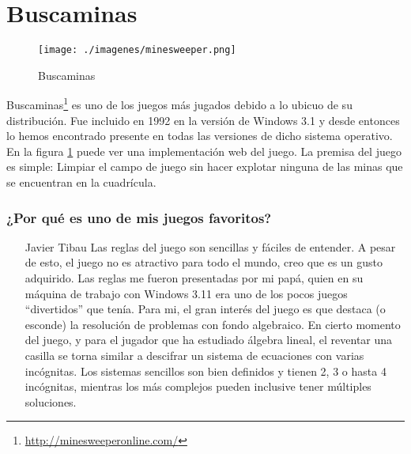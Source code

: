 \section{Buscaminas}

\begin{figure}[htbp]
\begin{center}
\texttt{[image: ./imagenes/minesweeper.png]}
\caption{Buscaminas}
\label{Buscaminas}
\end{center}
\end{figure}
Buscaminas\footnote{\url{http://minesweeperonline.com/}} es uno de los juegos más jugados debido a lo ubicuo de su distribución. Fue incluido en 1992 en la versión de Windows 3.1 y desde entonces lo hemos encontrado presente en todas las versiones de dicho sistema operativo.
En la figura \ref{Buscaminas} puede ver una implementación web del juego.
La premisa del juego es simple: Limpiar el campo de juego sin hacer explotar ninguna de las minas que se encuentran en la cuadrícula.

\subsubsection{¿Por qué es uno de mis juegos favoritos?}
\begin{itemize}
\item[Javier Tibau] Las reglas del juego son sencillas y fáciles de entender. A pesar de esto, el juego no es atractivo para todo el mundo, creo que es un gusto adquirido. Las reglas me fueron presentadas por mi papá, quien en su máquina de trabajo con Windows 3.11 era uno de los pocos juegos ``divertidos'' que tenía. Para mi, el gran interés del juego es que destaca (o esconde) la resolución de problemas con fondo algebraico. En cierto momento del juego, y para el jugador que ha estudiado álgebra lineal, el reventar una casilla se torna similar a descifrar un sistema de ecuaciones con varias incógnitas. Los sistemas sencillos son bien definidos y tienen 2, 3 o hasta 4 incógnitas, mientras los más complejos pueden inclusive tener múltiples soluciones.
\end{itemize}
